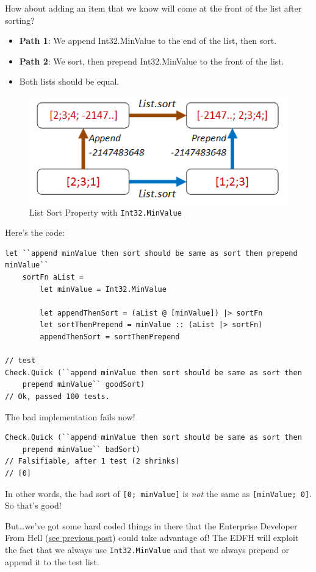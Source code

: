 How about adding an item that we know will come at the front of the list after sorting?

\begin{itemize}
\item \textbf{Path 1}: We append Int32.MinValue to the end of the list, then sort.
\item \textbf{Path 2}: We sort, then prepend Int32.MinValue to the front of the list.
\item Both lists should be equal.
\end{itemize}
\begin{figure}[htbp]
 \centering
 \includegraphics[width=.95\linewidth]{./pics/choosing_properties_10.png}
 \caption{List Sort Property with \texttt{Int32.MinValue}}
 \label{fig:choosing_properties_10}
\end{figure}
Here's the code:

\begin{verbatim}
let ``append minValue then sort should be same as sort then prepend minValue`` 
    sortFn aList = 
        let minValue = Int32.MinValue

        let appendThenSort = (aList @ [minValue]) |> sortFn 
        let sortThenPrepend = minValue :: (aList |> sortFn)
        appendThenSort = sortThenPrepend 

// test
Check.Quick (``append minValue then sort should be same as sort then 
    prepend minValue`` goodSort)
// Ok, passed 100 tests.
\end{verbatim}
The bad implementation fails now!

\begin{verbatim}
Check.Quick (``append minValue then sort should be same as sort then 
    prepend minValue`` badSort)
// Falsifiable, after 1 test (2 shrinks) 
// [0]
\end{verbatim}
In other words, the bad sort of \texttt{[0; minValue]} is \textit{not} the same as \texttt{[minValue; 0]}.
So that's good!

But\ldots we've got some hard coded things in there that the Enterprise Developer From Hell (\href{https://fsharpforfunandprofit.com/posts/property-based-testing/}{see previous post}) could take advantage of! The EDFH will exploit the fact that we always use \texttt{Int32.MinValue} and that we always prepend or append it to the test list.

